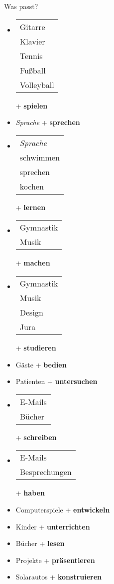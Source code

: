 \begin{syntax}{Was passt?}{}
\begin{itemize}
	\item \begin{tabular}{l}
			Gitarre \\
			Klavier \\
			Tennis \\
			Fußball \\
			Volleyball
		\end{tabular} + \textbf{spielen}
	\item \textit{Sprache} + \textbf{sprechen}
	\item \begin{tabular}{l}
			\textit{Sprache} \\
			schwimmen \\
			sprechen \\
			kochen
		\end{tabular} + \textbf{lernen}
	\item \begin{tabular}{l}
			Gymnastik \\
			Musik
		\end{tabular} + \textbf{machen}
	\item \begin{tabular}{l}
			Gymnastik \\
			Musik \\
			Design \\
			Jura
		\end{tabular} + \textbf{studieren}
	\item Gäste + \textbf{bedien}
	\item Patienten + \textbf{untersuchen}
	\item \begin{tabular}{l}
			E-Mails \\
			Bücher
		\end{tabular} + \textbf{schreiben}
	\item \begin{tabular}{l}
			E-Mails \\
			Besprechungen
		\end{tabular} + \textbf{haben}
	\item Computerspiele + \textbf{entwickeln}
	\item Kinder + \textbf{unterrichten}
	\item Bücher + \textbf{lesen}
	\item Projekte + \textbf{präsentieren}
	\item Solarautos + \textbf{konstruieren}

\end{itemize}
\end{syntax}
